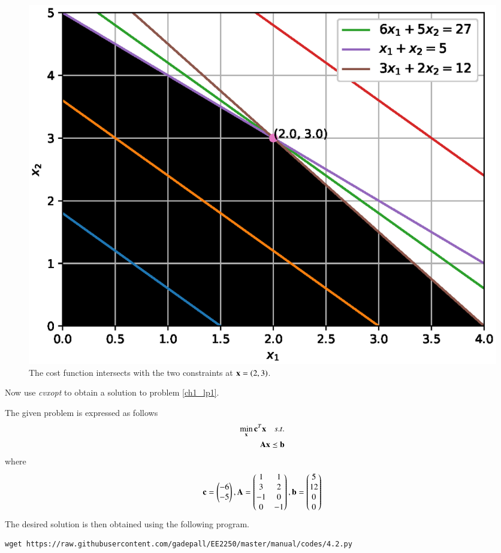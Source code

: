 \documentclass[journal,12pt,twocolumn]{IEEEtran}
\begin{document}
%
\begin{figure}[!ht]
\centering
\includegraphics[width=\columnwidth]{./figs/4.1.eps}
\caption{ The cost function intersects with the two constraints at $\mathbf{x} = \left(2,3\right)$. }
\label{fig.4.1}	
\end{figure}
%
\begin{problem}
	Now use {\em cvxopt} to obtain a solution to problem \ref{ch1_lp1}.
\end{problem}
\solution
The given problem is expressed as follows
%
\begin{align}
\min_{\mathbf{x}}	\mathbf{c}^{T}\mathbf{x}\quad s.t.
\\
\mathbf{A}\mathbf{x} \preceq \mathbf{b}
\end{align}
%
where
%
\begin{equation}
\mathbf{c}
=
\begin{pmatrix}
-6
\\
-5
\end{pmatrix},
\mathbf{A} = 
\begin{pmatrix}
1 & 1
\\
3 & 2
\\
-1 & 0
\\
0 & -1
\end{pmatrix},
\mathbf{b}
= 
\begin{pmatrix}
5
\\
12
\\
0
\\
0 
\end{pmatrix}
\end{equation}
%	
The desired solution is then obtained using the following program.
\begin{lstlisting}
wget https://raw.githubusercontent.com/gadepall/EE2250/master/manual/codes/4.2.py
\end{lstlisting}
\end{document}
